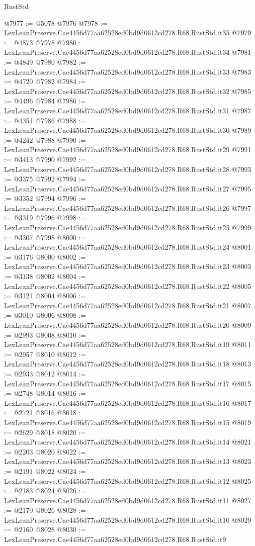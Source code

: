 \begin{lexlean}{RustStd}
\begin{coremodule}
@7977 := @5078 @7976
@7978 := LexLeanPreserve.Cae4456d77aa62528ed0bd9d0612cd278.R68.RustStd.it35
@7979 := @4873 @7978
@7980 := LexLeanPreserve.Cae4456d77aa62528ed0bd9d0612cd278.R68.RustStd.it34
@7981 := @4849 @7980
@7982 := LexLeanPreserve.Cae4456d77aa62528ed0bd9d0612cd278.R68.RustStd.it33
@7983 := @4720 @7982
@7984 := LexLeanPreserve.Cae4456d77aa62528ed0bd9d0612cd278.R68.RustStd.it32
@7985 := @4496 @7984
@7986 := LexLeanPreserve.Cae4456d77aa62528ed0bd9d0612cd278.R68.RustStd.it31
@7987 := @4351 @7986
@7988 := LexLeanPreserve.Cae4456d77aa62528ed0bd9d0612cd278.R68.RustStd.it30
@7989 := @4242 @7988
@7990 := LexLeanPreserve.Cae4456d77aa62528ed0bd9d0612cd278.R68.RustStd.it29
@7991 := @3413 @7990
@7992 := LexLeanPreserve.Cae4456d77aa62528ed0bd9d0612cd278.R68.RustStd.it28
@7993 := @3375 @7992
@7994 := LexLeanPreserve.Cae4456d77aa62528ed0bd9d0612cd278.R68.RustStd.it27
@7995 := @3352 @7994
@7996 := LexLeanPreserve.Cae4456d77aa62528ed0bd9d0612cd278.R68.RustStd.it26
@7997 := @3319 @7996
@7998 := LexLeanPreserve.Cae4456d77aa62528ed0bd9d0612cd278.R68.RustStd.it25
@7999 := @3307 @7998
@8000 := LexLeanPreserve.Cae4456d77aa62528ed0bd9d0612cd278.R68.RustStd.it24
@8001 := @3176 @8000
@8002 := LexLeanPreserve.Cae4456d77aa62528ed0bd9d0612cd278.R68.RustStd.it23
@8003 := @3138 @8002
@8004 := LexLeanPreserve.Cae4456d77aa62528ed0bd9d0612cd278.R68.RustStd.it22
@8005 := @3121 @8004
@8006 := LexLeanPreserve.Cae4456d77aa62528ed0bd9d0612cd278.R68.RustStd.it21
@8007 := @3010 @8006
@8008 := LexLeanPreserve.Cae4456d77aa62528ed0bd9d0612cd278.R68.RustStd.it20
@8009 := @2993 @8008
@8010 := LexLeanPreserve.Cae4456d77aa62528ed0bd9d0612cd278.R68.RustStd.it19
@8011 := @2957 @8010
@8012 := LexLeanPreserve.Cae4456d77aa62528ed0bd9d0612cd278.R68.RustStd.it18
@8013 := @2933 @8012
@8014 := LexLeanPreserve.Cae4456d77aa62528ed0bd9d0612cd278.R68.RustStd.it17
@8015 := @2748 @8014
@8016 := LexLeanPreserve.Cae4456d77aa62528ed0bd9d0612cd278.R68.RustStd.it16
@8017 := @2721 @8016
@8018 := LexLeanPreserve.Cae4456d77aa62528ed0bd9d0612cd278.R68.RustStd.it15
@8019 := @2629 @8018
@8020 := LexLeanPreserve.Cae4456d77aa62528ed0bd9d0612cd278.R68.RustStd.it14
@8021 := @2203 @8020
@8022 := LexLeanPreserve.Cae4456d77aa62528ed0bd9d0612cd278.R68.RustStd.it13
@8023 := @2191 @8022
@8024 := LexLeanPreserve.Cae4456d77aa62528ed0bd9d0612cd278.R68.RustStd.it12
@8025 := @2183 @8024
@8026 := LexLeanPreserve.Cae4456d77aa62528ed0bd9d0612cd278.R68.RustStd.it11
@8027 := @2170 @8026
@8028 := LexLeanPreserve.Cae4456d77aa62528ed0bd9d0612cd278.R68.RustStd.it10
@8029 := @2160 @8028
@8030 := LexLeanPreserve.Cae4456d77aa62528ed0bd9d0612cd278.R68.RustStd.it9

\end{coremodule}
\end{lexlean}
